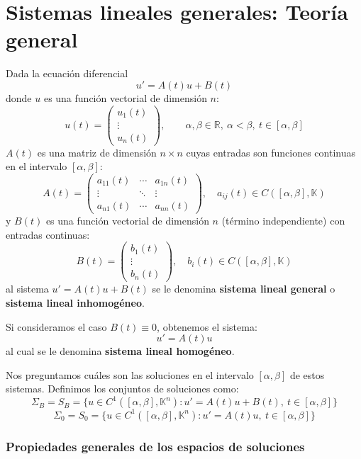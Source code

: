 \section{Sistemas lineales generales: Teoría general}

Dada la ecuación diferencial
\[
u' = A(t) u + B(t)
\]
donde \(u\) es una función vectorial de dimensión \(n\):
\[
    u(t) = \begin{pmatrix}
    u_1(t) \\
    \vdots \\
    u_n(t)
    \end{pmatrix}, \qquad \alpha, \beta \in \mathbb{R}, \ \alpha < \beta, \ t \in [\alpha, \beta]
\]
\(A(t)\) es una matriz de dimensión \(n \times n\) cuyas entradas son funciones continuas en el intervalo \([\alpha, \beta]\):
\[
    A(t) = \begin{pmatrix}
    a_{11}(t) & \cdots & a_{1n}(t) \\
    \vdots & \ddots & \vdots \\
    a_{n1}(t) & \cdots & a_{nn}(t)
    \end{pmatrix}, \quad a_{ij}(t) \in C([\alpha, \beta], \mathbb{K})
\]
y \(B(t)\) es una función vectorial de dimensión \(n\) (término independiente) con entradas continuas:
\[
    B(t) = \begin{pmatrix}
    b_1(t) \\
    \vdots \\
    b_n(t)
    \end{pmatrix}, \quad b_{i}(t) \in C([\alpha, \beta], \mathbb{K})
\]
al sistema $u' = A(t) u + B(t)$ se le denomina \textbf{sistema lineal general} o \textbf{sistema lineal inhomogéneo}. 

Si consideramos el caso $B(t) \equiv 0$, obtenemos el sistema:
\[
u' = A(t) u
\]
al cual se le denomina \textbf{sistema lineal homogéneo}.

Nos preguntamos cuáles son las soluciones en el intervalo \([\alpha, \beta]\) de estos sistemas. Definimos los conjuntos de soluciones como:
\[
    \Sigma_{B} = S_B = \{u \in C^{1}([\alpha, \beta], \mathbb{K}^n) : u' = A(t) u + B(t), \ t \in [\alpha, \beta]\}
\]
\[
    \Sigma_{0} = S_0 = \{u \in C^{1}([\alpha, \beta], \mathbb{K}^n) : u' = A(t) u, \ t \in [\alpha, \beta]\}
\]

\subsubsection*{Propiedades generales de los espacios de soluciones}

